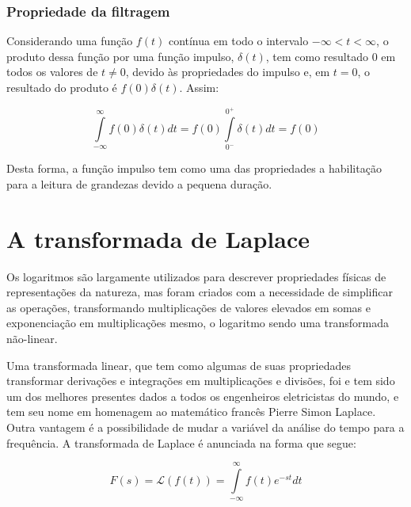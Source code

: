 \documentclass[12pt,fleqn]{book} %
\begin{document}
        \subsection{Propriedade da filtragem}
        
Considerando uma função $f(t)$ contínua em todo o intervalo $-\infty<t<\infty$, o produto dessa função por uma função impulso, $\delta(t)$, tem como resultado $0$ em todos os valores de $t\neq 0$, devido às propriedades do impulso e, em $t = 0$, o resultado do produto é $f(0)\delta(t)$. Assim:

\begin{equation}
\int\limits_{-\infty}^{\infty}f(0)\delta(t)dt = f(0)\int\limits_{0^-}^{0^+}\delta(t)dt = f(0)
\end{equation}

Desta forma, a função impulso tem como uma das propriedades a habilitação para a leitura de grandezas devido a pequena duração.



        
	
\chapter{A transformada de Laplace}

Os logaritmos são largamente utilizados para descrever propriedades físicas de representações da natureza, mas foram criados com a necessidade de simplificar as operações, transformando multiplicações de valores elevados em somas e exponenciação em multiplicações mesmo, o logaritmo sendo uma transformada não-linear.

Uma transformada linear, que tem como algumas de suas propriedades transformar derivações e integrações em multiplicações e divisões, foi e tem sido um dos melhores presentes dados a todos os engenheiros eletricistas do mundo, e tem seu nome em homenagem ao matemático francês Pierre Simon Laplace. Outra vantagem é a possibilidade de mudar a variável da análise do tempo para a frequência. A transformada de Laplace é anunciada na forma que segue:

\begin{equation}\label{Laplace}
F(s) = \mathscr{L}(f(t)) = \int\limits_{-\infty}^{\infty}f(t)e^{-st}dt
\end{equation}
\end{document}
